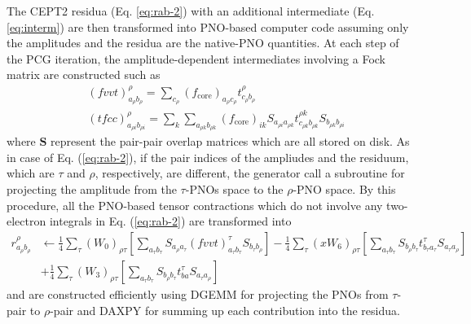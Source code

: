 \documentclass[aip,jcp,amsmath]{revtex4-1}
\begin{document}
%
The CEPT2 residua (Eq. \ref{eq:rab-2}) with an additional intermediate (Eq. \ref{eq:interm}) are then transformed into PNO-based computer code assuming only the amplitudes and the residua are the native-PNO quantities.
%
At each step of the PCG iteration, the amplitude-dependent intermediates involving a Fock matrix are constructed such as
%
\begin{align}
  &(fvvt)_{a_{\rho}b_{\rho}}^\rho=\sum_{c_{\rho}} (f_\text{core})_{a_{\rho}c_{\rho}}t_{c_{\rho}b_{\rho}}^\rho \\
  &(tfcc)_{a_{\rho i}b_{\rho i}}^\rho=\sum_{k} \sum_{a_{\rho k}b_{\rho k}} (f_\text{core})_{ik} S_{a_{\rho i}a_{\rho k}}t_{c_{\rho k}b_{\rho k}}^{\rho k} S_{b_{\rho k}b_{\rho i}}
\end{align}
%
where $\mathbf{S}$ represent the pair-pair overlap matrices which are all stored on disk.
%
As in case of Eq. (\ref{eq:rab-2}), if the pair indices of the ampliudes and the residuum, which are $\tau$ and $\rho$, respectively, are different, the generator call a subroutine for projecting the amplitude from the $\tau$-PNOs space to the $\rho$-PNO space.
%
By this procedure, all the PNO-based tensor contractions which do not involve any two-electron integrals in Eq. (\ref{eq:rab-2}) are transformed into
%
\begin{align}
  r_{a_\rho b_\rho}^\rho &\leftarrow \frac{1}{4}\sum_\tau(W_0)_{\rho\tau} \left[\sum_{a_\tau b_\tau} S_{a_\rho a_\tau}(fvvt)_{a_\tau b_\tau}^\tau S_{b_\tau b_\rho}\right] - \frac{1}{4}\sum_\tau (xW_6)_{\rho\tau} \left[\sum_{a_\tau b_\tau} S_{b_\rho b_\tau} t_{b_\tau a_\tau}^\tau S_{a_\tau a_\rho}\right] \nonumber \\
  &+ \frac{1}{4}\sum_\tau (W_3)_{\rho\tau} \left[\sum_{a_\tau b_\tau} S_{b_\rho b_\tau} t_{ba}^\tau S_{a_\tau a_\rho}\right] \label{eq:rab-3}
\end{align}
%
and are constructed efficiently using DGEMM for projecting the PNOs from $\tau$-pair to $\rho$-pair and DAXPY for summing up each contribution into the residua.
\end{document}
